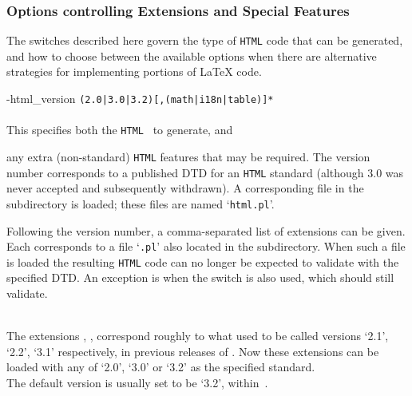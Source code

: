 \subsubsection{Options controlling Extensions and Special Features}
%
\html{\\}\noindent
The switches described here govern the type of \texttt{HTML} code that
can be generated, and how to choose between the available options 
when there are alternative strategies for implementing portions of \LaTeX{} code. 

\begin{htmllist}%
%
%
%
\item [ -html\_version \texttt{(2.0|3.0|3.2)[,(math|i18n|table)]*}\label{htmlversion}]
~\\\\
This specifies both the \texttt{HTML}~ to generate, 
and\html{ \dots}%
\begin{changebar}
any extra (non-standard) \texttt{HTML} features that may be required.\html{\\}
The version number corresponds to a published DTD for an \texttt{HTML} standard
(although 3.0 was never accepted and subsequently withdrawn).
A corresponding \Perl{} file in the  subdirectory is loaded;
these files are named `\texttt{html}\texttt{.pl}'.

Following the version number, a comma-separated list of extensions
can be given. Each corresponds to a file `\texttt{.pl}' 
also located in the  subdirectory. 
When such a file is loaded the resulting \texttt{HTML} code 
can no longer be expected to validate with the specified DTD. 
An exception is  when the  
switch is also used, which should still validate.
\end{changebar}
\\  
The extensions , , 
correspond roughly to what used to be called versions `2.1', `2.2', `3.1'
respectively, in previous releases of \latextohtml.
Now these extensions can be loaded with any of `2.0', `3.0' or `3.2' 
as the specified standard.\\  
The default version is usually set to be `3.2', within \,.%


\end{htmllist}
